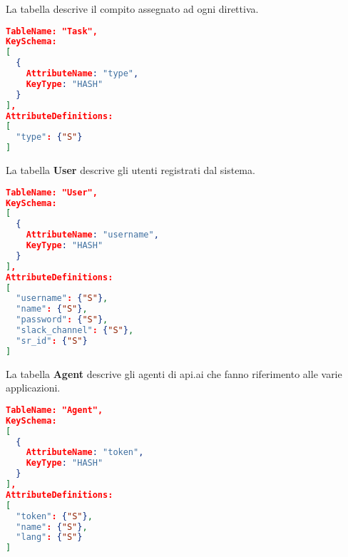 La tabella \textbf{} descrive il compito assegnato ad ogni direttiva.
\begin{lstlisting}[language=json,firstnumber=1]
TableName: "Task",
KeySchema: 
[
  {
    AttributeName: "type",
    KeyType: "HASH"	
  }
],
AttributeDefinitions: 
[
  "type": {"S"}
]
\end{lstlisting}
\newpage
La tabella \textbf{User} descrive gli utenti registrati dal sistema. 
\begin{lstlisting}[language=json,firstnumber=1]
TableName: "User",
KeySchema: 
[
  {
    AttributeName: "username",
    KeyType: "HASH"
  }	
],
AttributeDefinitions: 
[
  "username": {"S"},
  "name": {"S"},
  "password": {"S"},
  "slack_channel": {"S"},
  "sr_id": {"S"}
]
\end{lstlisting}

La tabella \textbf{Agent} descrive gli agenti di api.ai che fanno riferimento alle varie applicazioni.
\begin{lstlisting}[language=json,firstnumber=1]
TableName: "Agent",
KeySchema:
[
  {
    AttributeName: "token",
    KeyType: "HASH"
  }	
],
AttributeDefinitions: 
[
  "token": {"S"},
  "name": {"S"},
  "lang": {"S"}
]
\end{lstlisting}